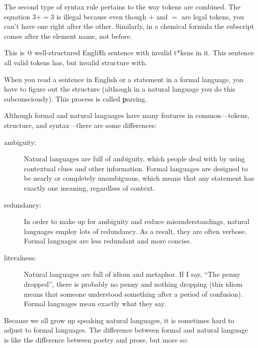 \documentclass[
DIV=11,
fontsize=12,
twoside,
headinclude=false,
titlepage=firstiscover,
abstract=true,
headsepline=true,
footsepline=true,
chapterprefix=true, %
headings=big,
bibliography=totoc,%
captions=tableheading
]{scrbook}
\theoremstyle{definition}
\begin{document}
The second type of syntax rule pertains to the way tokens are
combined.  The equation $3 += 3$ is illegal because even though $+$
and $=$ are legal tokens, you can't have one right after the other.
Similarly, in a chemical formula the subscript comes after the element
name, not before.

This is @ well-structured Engli\$h
sentence with invalid t*kens in it.  This sentence all valid tokens
has, but invalid structure with.

When you read a sentence in English or a statement in a formal
language, you have to figure out the structure
(although in a natural language you do this subconsciously).  This
process is called {\textbf parsing}.

Although formal and natural languages have many features in
common---tokens, structure, and syntax---there are some
differences:

\begin{description}

\item[ambiguity:] Natural languages are full of ambiguity, which
people deal with by using contextual clues and other information.
Formal languages are designed to be nearly or completely unambiguous,
which means that any statement has exactly one meaning,
regardless of context.

\item[redundancy:] In order to make up for ambiguity and reduce
misunderstandings, natural languages employ lots of
redundancy.  As a result, they are often verbose.  Formal languages
are less redundant and more concise.

\item[literalness:] Natural languages are full of idiom and metaphor.
If I say, ``The penny dropped'', there is probably no penny and
nothing dropping (this idiom means that someone understood something
after a period of confusion).  Formal languages
mean exactly what they say.

\end{description}

Because we all grow up speaking natural languages, it is sometimes
hard to adjust to formal languages.  The difference between formal and
natural language is like the difference between poetry and prose, but
more so:  
\end{document}
